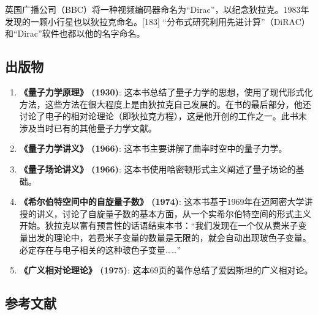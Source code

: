 英国广播公司（BBC）将一种视频编码器命名为“Dirac”，以纪念狄拉克。1983年发现的一颗小行星也以狄拉克命名。[183] “分布式研究利用先进计算”（DiRAC）和“Dirac”软件也都以他的名字命名。
\subsection{出版物}
\begin{enumerate}
\item \textbf{《量子力学原理》 (1930)}: 这本书总结了量子力学的思想，使用了现代形式化方法，这些方法在很大程度上是由狄拉克自己发展的。在书的最后部分，他还讨论了电子的相对论理论（即狄拉克方程），这是他开创的工作之一。此书未涉及当时已有的其他量子力学文献。
\item \textbf{《量子力学讲义》 (1966)}: 这本书主要讲解了曲率时空中的量子力学。
\item \textbf{《量子场论讲义》 (1966)}: 这本书使用哈密顿形式主义阐述了量子场论的基础。
\item \textbf{《希尔伯特空间中的自旋量子数》 (1974)}: 这本书基于1969年在迈阿密大学讲授的讲义，讨论了自旋量子数的基本方面，从一个实希尔伯特空间的形式主义开始。狄拉克以富有预言性的话语结束本书：“我们发现在一个仅从费米子变量出发的理论中，若费米子变量的数量是无限的，就会自动出现玻色子变量。必定存在与电子相关的这种玻色子变量……”
\item \textbf{《广义相对论理论》 (1975)}: 这本69页的著作总结了爱因斯坦的广义相对论。
\end{enumerate}
\subsection{参考文献}
